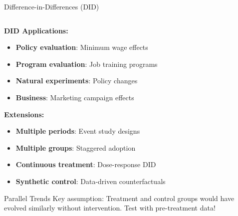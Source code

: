 \documentclass[aspectratio=169,11pt]{beamer}
\begin{document}
\begin{frame}[fragile]{Difference-in-Differences (DID)}
\begin{columns}
\begin{column}{0.45\textwidth}
\begin{figure}
\end{figure}

\textbf{DID Applications:}
\begin{itemize}
\item \textbf{Policy evaluation}: Minimum wage effects
\item \textbf{Program evaluation}: Job training programs
\item \textbf{Natural experiments}: Policy changes
\item \textbf{Business}: Marketing campaign effects
\end{itemize}

\textbf{Extensions:}
\begin{itemize}
\item \textbf{Multiple periods}: Event study designs
\item \textbf{Multiple groups}: Staggered adoption
\item \textbf{Continuous treatment}: Dose-response DID
\item \textbf{Synthetic control}: Data-driven counterfactuals
\end{itemize}

\begin{alertblock}{Parallel Trends}
Key assumption: Treatment and control groups would have evolved similarly without intervention. Test with pre-treatment data!
\end{alertblock}
\end{column}
\end{columns}
\end{frame}
\end{document}
